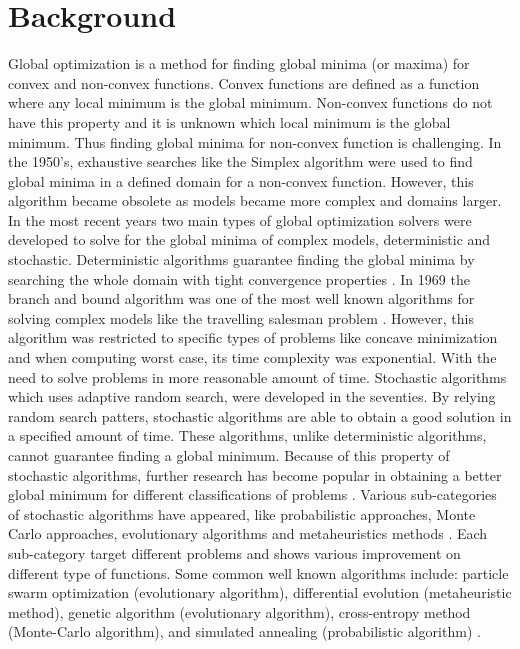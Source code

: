 \chapter{Background}
\label{background}

Global optimization is a method for finding global minima (or maxima) for convex and non-convex functions. Convex functions are defined as a function where any local minimum is the global minimum. Non-convex functions do not have this property and it is unknown which local minimum is the global minimum. Thus finding global minima for non-convex function is challenging. In the 1950's, exhaustive searches like the Simplex algorithm\cite{Liberti2000} were used to find global minima in a defined
domain for a non-convex function. However, this algorithm became obsolete as models became more complex and domains larger. In the most recent years two main types of global optimization solvers were developed to solve for the global minima of complex models, deterministic and stochastic. 
Deterministic algorithms guarantee finding the global minima by searching the whole
domain with tight convergence properties \cite{Pinter2002}. In 1969 the branch and bound algorithm \cite{Liberti2000} was one of the most well known algorithms for solving complex models like the travelling salesman problem \cite{Liberti2000}. However, this algorithm was restricted to specific types of problems like concave minimization and when computing worst case, its time complexity was exponential. With the need to solve problems in more reasonable amount of time. Stochastic
algorithms which uses adaptive random search, were developed in the seventies. 
By relying random search patters, stochastic algorithms are able to
obtain a good solution in a specified amount of time. These algorithms, unlike deterministic algorithms, cannot guarantee finding a global minimum. Because of this property of stochastic algorithms, further research has become popular in obtaining a better global minimum for different classifications of problems \cite{Aguiar,Pinter2002}. Various sub-categories of stochastic algorithms have appeared, like probabilistic approaches, Monte Carlo approaches, evolutionary algorithms \cite{Aguiar} and metaheuristics methods
\cite{Can2015}. Each sub-category target different problems
and shows various improvement on different type of functions. Some common well known algorithms include: particle swarm optimization (evolutionary algorithm), differential evolution (metaheuristic method), genetic algorithm (evolutionary algorithm), cross-entropy method (Monte-Carlo algorithm), and simulated annealing (probabilistic algorithm) \cite{Aguiar}.  


